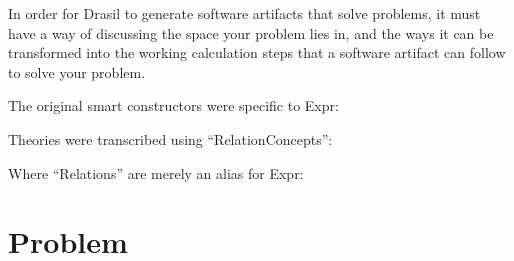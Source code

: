 
In order for Drasil to generate software artifacts that solve problems, it must
have a way of discussing the space your problem lies in, and the ways it can be
transformed into the working calculation steps that a software artifact can
follow to solve your problem.

\originalExprHaskell

The original smart constructors were specific to Expr:

\originalFewExprSmartConstructorsHaskell

Theories were transcribed using ``RelationConcepts'':

\originalRelationConcept

Where ``Relations'' are merely an alias for Expr:

\originalRelation

\section{Problem}

